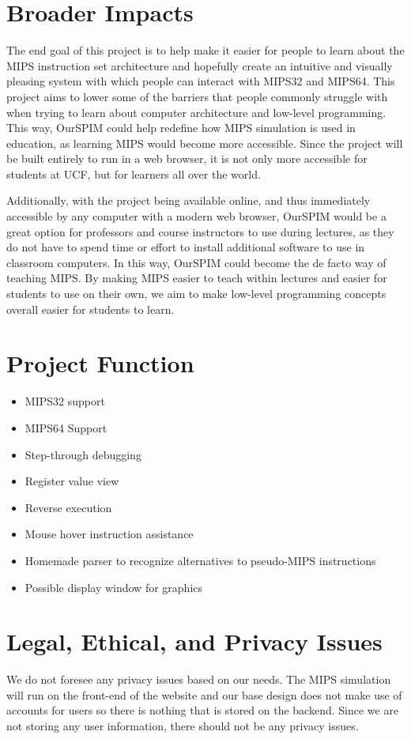 \documentclass[parskip=half, fontsize=12pt]{scrartcl}
\begin{document}
\section{Broader Impacts}
The end goal of this project is to help make it easier for people to learn about the MIPS instruction set architecture and hopefully create an intuitive and visually pleasing system with which people can interact with MIPS32 and MIPS64. This project aims to lower some of the barriers that people commonly struggle with when trying to learn about computer architecture and low-level programming. This way, OurSPIM could help redefine how MIPS simulation is used in education, as learning MIPS would become more accessible. Since the project will be built entirely to run in a web browser, it is not only more accessible for students at UCF, but for learners all over the world.

Additionally, with the project being available online, and thus immediately accessible by any computer with a modern web browser, OurSPIM would be a great option for professors and course instructors to use during lectures, as they do not have to spend time or effort to install additional software to use in classroom computers. In this way, OurSPIM could become the de facto way of teaching MIPS. By making MIPS easier to teach within lectures and easier for students to use on their own, we aim to make low-level programming concepts overall easier for students to learn.



\section{Project Function}
\begin{itemize}
    \item MIPS32 support
    \item MIPS64 Support
    \item Step-through debugging
    \item Register value view
    \item Reverse execution
    \item Mouse hover instruction assistance
    \item Homemade parser to recognize alternatives to pseudo-MIPS instructions
    \item Possible display window for graphics
\end{itemize}


\section{Legal, Ethical, and Privacy Issues}
We do not foresee any privacy issues based on our needs. The MIPS simulation will run on the front-end of the website and our base design does not make use of accounts for users so there is nothing that is stored on the backend. Since we are not storing any user information, there should not be any privacy issues.
\end{document}
